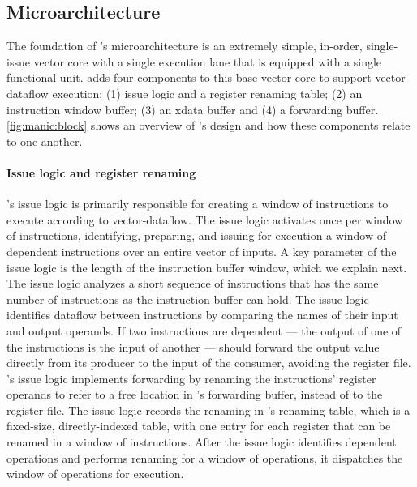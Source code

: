 \subsection{Microarchitecture}
\label{manic:manic:uarch}
The foundation of \manic's microarchitecture is an extremely simple, in-order,
single-issue vector core with a single execution lane that is equipped with a
single functional unit. 
%
\manic adds four components to this base vector core to support vector-dataflow execution: (1) issue logic and a register renaming table; (2) an
instruction window buffer; (3) an xdata buffer and (4) a forwarding buffer. 
% 
\autoref{fig:manic:block} shows an overview of \manic's design and how these
components relate to one another.
%

\figMANICBlock

\paragraph{Issue logic and register renaming}
\manic's issue logic is primarily responsible for creating a window of
instructions to execute according to vector-dataflow.
%
The issue logic activates once per window of instructions, identifying,
preparing, and issuing for execution a window of dependent instructions over an entire vector of inputs.
%
A key parameter of the issue logic is the length of the instruction buffer
window, which we explain next.
%
The issue logic analyzes a short sequence of instructions that has the same
number of instructions as the instruction buffer can hold. 
%
The issue logic identifies dataflow between instructions by comparing the names
of their input and output operands. 
%
If two instructions are dependent --- the output of one of the instructions is 
the input of another ---  \manic should forward the output value directly from
its producer to the input of the consumer, avoiding the register file.
\manic's issue logic implements forwarding by renaming the instructions' register operands 
to refer to a free location in \manic's forwarding
buffer, instead of to the register file. 
%
The issue logic records the renaming in \manic's renaming table, which is a
fixed-size, directly-indexed table, with one entry for each register that can
be renamed in a window of instructions.
%
After the issue logic identifies dependent operations and performs renaming for
a window of operations, it dispatches the window of operations for execution.


